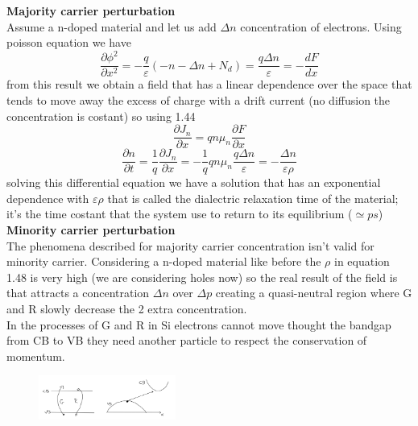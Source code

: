 \vspace{5mm}
{\bf Majority carrier perturbation}\\
Assume a n-doped material and let us add $\Delta n$ concentration of electrons. Using poisson equation we have
\begin{equation}
\frac{\partial \phi^2}{\partial x^2}=-\frac{q}{\varepsilon}\left(-n-\Delta n + N_d\right)=\frac{q\Delta n}{\varepsilon}=-\frac{dF}{dx} 
\end{equation}
from this result we obtain a field that has a linear dependence over the space that tends to move away the excess of charge with a drift current (no diffusion the concentration is costant) so using  1.44
\begin{equation}
\frac{\partial J_n}{\partial x}=qn\mu_n\frac{\partial F}{\partial x}
\end{equation}
\begin{equation}
\frac{\partial n}{\partial t}=\frac{1}{q}\frac{\partial J_n}{\partial x}=-\frac{1}{q}qn\mu_n\frac{q\Delta n}{\varepsilon}=-\frac{\Delta n}{\varepsilon \rho}
\end{equation}
solving this differential equation we have a solution that has an exponential dependence with $\varepsilon \rho$ that is called the dialectric relaxation time of the material; it's the time costant that the system use to return to its equilibrium ($\simeq ps$)\\

\vspace{5mm}
{\bf Minority carrier perturbation}\\
The phenomena described for majority carrier concentration isn't valid for minority carrier. Considering a n-doped material like before the $\rho$ in equation 1.48 is very high (we are considering holes now) so the real result of the field is that attracts a concentration $\Delta n$ over $\Delta p$ creating a quasi-neutral region where G and R slowly decrease the 2 extra concentration.\\
In the processes of G and R in Si electrons cannot move thought the bandgap from CB to VB they need another particle to respect the conservation of momentum.\\

\begin{figure}
\includegraphics[width=0.4\textwidth]{srhp1.png}
\end{figure}

